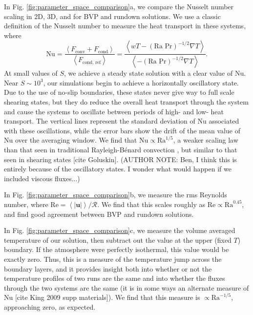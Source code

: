 \documentclass[aps, pre, onecolumn, nofootinbib, notitlepage, groupedaddress, amsfonts, amssymb, amsmath, longbibliography]{revtex4-1}
\newcommand{\angles}[1]{\ensuremath{\left\langle #1 \right\rangle}}
\newcommand{\grad}{\ensuremath{\nabla}}
\newcommand{\RB}{Rayleigh-B\'{e}nard }
\begin{document}
In Fig. \ref{fig:parameter_space_comparison}a, we compare the Nusselt number scaling in 2D,
3D, and for BVP and rundown solutions.  We use a classic definition of the Nusselt number
to measure the heat transport in these systems, where
\begin{equation}
\text{Nu} = \frac{\angles{F_{\text{conv}} + F_{\text{cond}}}}{\angles{F_{\text{cond, ref}}}}
 = \frac{\angles{wT - (\text{Ra Pr})^{-1/2}\grad T}}{\angles{- (\text{Ra Pr})^{-1/2} \grad T}}.
\end{equation}
At small values of $S$, we achieve a steady state solution with a clear value of Nu.  Near
$S \sim 10^3$, our simulations begin to achieve a horizontally oscillatory state.  Due to the
use of no-slip boundaries, these states never give way to full scale shearing states, but they
do reduce the overall heat transport through the system and cause the systems to oscillate between
periods of high- and low- heat transport.  The vertical lines represent the standard deviation 
of Nu associated with these oscillations, while the error bars show the drift of the mean
value of Nu over the averaging window.  We find that $\text{Nu} \propto \text{Ra}^{1/5}$,
a weaker scaling law than that seen in traditional \RB convection \cite{johnston&doering2009},
but similar to that seen in shearing states [cite Goluskin].
(AUTHOR NOTE: Ben, I think this is entirely because of the oscillatory states.  I wonder what
would happen if we included viscous fluxes...)

In Fig. \ref{fig:parameter_space_comparison}b, we measure the rms Reynolds number, where
$\text{Re} = \angles{|\bm{u}|} / \mathcal{R}$.  We find that this scales roughly as
$\text{Re} \propto \text{Ra}^{0.45}$, and find good agreement between BVP and rundown solutions.

In Fig. \ref{fig:parameter_space_comparison}c, we measure the volume averaged 
temperature of our solution, then subtract out the value at the upper (fixed $T$) boundary.
If the atmosphere were perfectly isothermal, this value would be exactly zero.  Thus, this is
a measure of the temperature jump across the boundary layers, and it provides insight both
into whether or not the temperature profiles of two runs are the same and into whether
the fluxes through the two systems are the same (it is in some ways an alternate measure of Nu
[cite King 2009 supp materials]).
We find that this measure is $\propto \text{Ra}^{-1/5}$, approaching zero, as expected.
\end{document}

